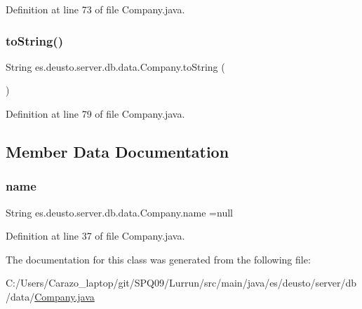 Definition at line 73 of file Company.\+java.

\mbox{\label{classes_1_1deusto_1_1server_1_1db_1_1data_1_1_company_a3896b4f463ebed4f07fd3d9d0639b75a}} 
\subsubsection{\texorpdfstring{to\+String()}{toString()}}
{\footnotesize\ttfamily String es.\+deusto.\+server.\+db.\+data.\+Company.\+to\+String (\begin{DoxyParamCaption}{ }\end{DoxyParamCaption})}



Definition at line 79 of file Company.\+java.



\subsection{Member Data Documentation}
\mbox{\label{classes_1_1deusto_1_1server_1_1db_1_1data_1_1_company_a3080458c34b5cf83c7f8e866a93e60ac}} 
\subsubsection{\texorpdfstring{name}{name}}
{\footnotesize\ttfamily String es.\+deusto.\+server.\+db.\+data.\+Company.\+name =null\hspace{0.3cm}{\ttfamily [protected]}}



Definition at line 37 of file Company.\+java.



The documentation for this class was generated from the following file\+:\begin{DoxyCompactItemize}
\item 
C\+:/\+Users/\+Carazo\+\_\+laptop/git/\+S\+P\+Q09/\+Lurrun/src/main/java/es/deusto/server/db/data/\hyperlink{_company_8java}{Company.\+java}\end{DoxyCompactItemize}
